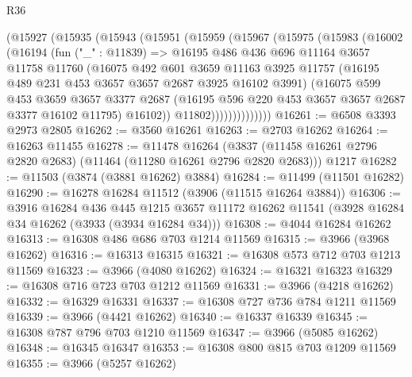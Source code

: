 \begin{lexlean}{R36}
\begin{coremodule}
          (@15927
            (@15935
              (@15943
                (@15951
                  (@15959
                    (@15967
                      (@15975
                        (@15983
                          (@16002
                            (@16194
                              (fun ("_" : @11839) =>
                              @16195
                                @486
                                @436
                                @696
                                @11164
                                @3657
                                @11758
                                @11760
                                (@16075
                                  @492
                                  @601
                                  @3659
                                  @11163
                                  @3925
                                  @11757
                                  (@16195 @489 @231 @453 @3657 @3657 @2687 @3925 @16102 @3991)
                                  (@16075
                                    @599
                                    @453
                                    @3659
                                    @3657
                                    @3377
                                    @2687
                                    (@16195 @596 @220 @453 @3657 @3657 @2687 @3377 @16102 @11795)
                                    @16102))
                                @11802))))))))))))))
@16261 := @6508 @3393 @2973 @2805
@16262 := @3560 @16261
@16263 := @2703 @16262
@16264 := @16263 @11455
@16278 := @11478
    @16264
    (@3837 (@11458 @16261 @2796 @2820 @2683) (@11464 (@11280 @16261 @2796 @2820 @2683)))
    @1217
@16282 := @11503 (@3874 (@3881 @16262) @3884)
@16284 := @11499 (@11501 @16282)
@16290 := @16278 @16284 @11512 (@3906 (@11515 @16264 @3884))
@16306 := @3916
    @16284
    @436
    @445
    @1215
    @3657
    @11172
    @16262
    @11541
    (@3928 @16284 @34 @16262 (@3933 (@3934 @16284 @34)))
@16308 := @4044 @16284 @16262
@16313 := @16308 @486 @686 @703 @1214 @11569
@16315 := @3966 (@3968 @16262)
@16316 := @16313 @16315
@16321 := @16308 @573 @712 @703 @1213 @11569
@16323 := @3966 (@4080 @16262)
@16324 := @16321 @16323
@16329 := @16308 @716 @723 @703 @1212 @11569
@16331 := @3966 (@4218 @16262)
@16332 := @16329 @16331
@16337 := @16308 @727 @736 @784 @1211 @11569
@16339 := @3966 (@4421 @16262)
@16340 := @16337 @16339
@16345 := @16308 @787 @796 @703 @1210 @11569
@16347 := @3966 (@5085 @16262)
@16348 := @16345 @16347
@16353 := @16308 @800 @815 @703 @1209 @11569
@16355 := @3966 (@5257 @16262)

\end{coremodule}
\end{lexlean}
